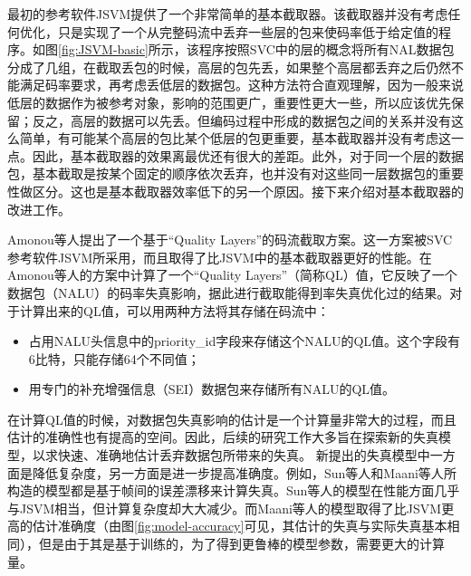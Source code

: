 最初的参考软件JSVM提供了一个非常简单的基本截取器。该截取器并没有考虑任何优化，只是实现了一个从完整码流中丢弃一些层的包来使码率低于给定值的程序。如图\ref{fig:JSVM-basic}\supercite{Amonou2007}所示，该程序按照SVC中的层的概念将所有NAL数据包分成了几组，在截取丢包的时候，高层的包先丢，如果整个高层都丢弃之后仍然不能满足码率要求，再考虑丢低层的数据包。这种方法符合直观理解，因为一般来说低层的数据作为被参考对象，影响的范围更广，重要性更大一些，所以应该优先保留；反之，高层的数据可以先丢。但编码过程中形成的数据包之间的关系并没有这么简单，有可能某个高层的包比某个低层的包更重要，基本截取器并没有考虑这一点。因此，基本截取器的效果离最优还有很大的差距。此外，对于同一个层的数据包，基本截取是按某个固定的顺序依次丢弃，也并没有对这些同一层数据包的重要性做区分。这也是基本截取器效率低下的另一个原因。接下来介绍对基本截取器的改进工作。

Amonou等人\supercite{Amonou2007}提出了一个基于“Quality Layers”的码流截取方案。这一方案被SVC
参考软件JSVM所采用，而且取得了比JSVM中的基本截取器更好的性能。在Amonou等人的方案中计算了一个“Quality Layers”（简称QL）值，它反映了一个数据包（NALU）的码率失真影响，据此进行截取能得到率失真优化过的结果。对于计算出来的QL值，可以用两种方法将其存储在码流中：

\begin{itemize}
\item 占用NALU头信息中的priority\_id字段来存储这个NALU的QL值。这个字段有6比特，只能存储64个不同值；
\item 用专门的补充增强信息（SEI）数据包来存储所有NALU的QL值。
\end{itemize}

在计算QL值的时候，对数据包失真影响的估计是一个计算量非常大的过程，而且估计的准确性也有提高的空间。因此，后续的研究工作大多旨在探索新的失真模型，以求快速、准确地估计丢弃数据包所带来的失真。
新提出的失真模型中一方面是降低复杂度，另一方面是进一步提高准确度。例如，Sun等人\supercite{Sun2009}和Maani等人\supercite{Maani2009}所构造的模型都是基于帧间的误差漂移来计算失真。Sun等人的模型在性能方面几乎与JSVM相当，但计算复杂度却大大减少。而Maani等人的模型取得了比JSVM更高的估计准确度（由图\ref{fig:model-accuracy}\supercite{Maani2009}可见，其估计的失真与实际失真基本相同），但是由于其是基于训练的，为了得到更鲁棒的模型参数，需要更大的计算量。

